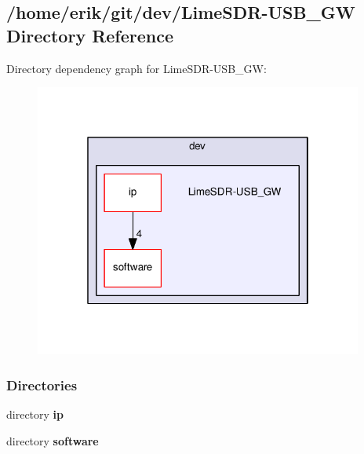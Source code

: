 \subsection{/home/erik/git/dev/\+Lime\+S\+D\+R-\/\+U\+S\+B\+\_\+\+GW Directory Reference}
\label{dir_afefbdb0e58aef8b2f7be9a1f614c270}
Directory dependency graph for Lime\+S\+D\+R-\/\+U\+S\+B\+\_\+\+GW\+:
\nopagebreak
\begin{figure}[H]
\begin{center}
\leavevmode
\includegraphics[width=306pt]{dir_afefbdb0e58aef8b2f7be9a1f614c270_dep}
\end{center}
\end{figure}
\subsubsection*{Directories}
\begin{DoxyCompactItemize}
\item 
directory {\bf ip}
\item 
directory {\bf software}
\end{DoxyCompactItemize}
